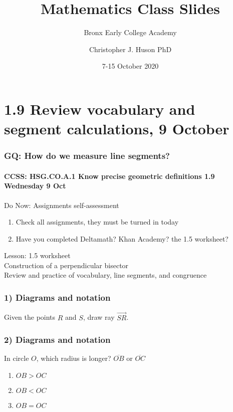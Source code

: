 \documentclass{beamer}
\title{Mathematics Class Slides}
\subtitle{Bronx Early College Academy}
\author{Christopher J. Huson PhD}
\date{7-15 October 2020}
\begin{document}
\frame{\titlepage}
\section[Outline]{}
\frame{\tableofcontents}

\section{1.9 Review vocabulary and segment calculations, 9 October}
  \frame
  {
    \frametitle{GQ: How do we measure line segments?}
    \framesubtitle{CCSS: HSG.CO.A.1 Know precise geometric definitions  \hfill \alert{1.9 Wednesday 9 Oct}}
  
    \begin{block}{Do Now: Assignments self-assessment}
    \begin{enumerate}
        \item Check all assignments, they must be turned in today
        \item Have you completed Deltamath? Khan Academy? the 1.5 worksheet?
    \end{enumerate}
    \end{block}
    Lesson: 1.5 worksheet\\
    Construction of a perpendicular bisector \\
    Review and practice of vocabulary, line segments, and congruence
  }

  \frame
  {
    \frametitle{1) Diagrams and notation}
    Given the points $R$ and $S$, draw ray $\overrightarrow{SR}$.\\
    \vspace{2cm}
    \begin{center}
    \end{center} \vspace{1cm}
  }


  \frame
  {
    \frametitle{2) Diagrams and notation}
      In circle $O$, which radius is longer? $\overline{OB}$ or $\overline{OC}$
      \begin{enumerate}
        \item $OB > OC$
        \item $OB < OC$
        \item $OB = OC$
        \end{enumerate}
  }
\end{document}
